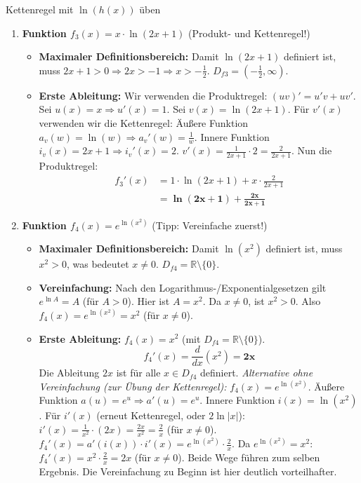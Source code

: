 \begin{loesungsumgebung}{Kettenregel mit \texorpdfstring{$\ln(h(x))$}{ln(h(x))} üben}
\begin{enumerate}[label=(\alph*)]
    \item \textbf{Funktion $f_3(x) = x \cdot \ln(2x+1)$} (Produkt- und Kettenregel!)
    \begin{itemize}
        \item \textbf{Maximaler Definitionsbereich:}
        Damit $\ln(2x+1)$ definiert ist, muss $2x+1 > 0 \Rightarrow 2x > -1 \Rightarrow x > -\frac{1}{2}$.
        $D_{f3} = (-\frac{1}{2}, \infty)$.
        \item \textbf{Erste Ableitung:}
        Wir verwenden die Produktregel: $(uv)' = u'v + uv'$.
        Sei $u(x) = x \Rightarrow u'(x) = 1$.
        Sei $v(x) = \ln(2x+1)$. Für $v'(x)$ verwenden wir die Kettenregel:
        Äußere Funktion $a_v(w) = \ln(w) \Rightarrow a_v'(w) = \frac{1}{w}$.
        Innere Funktion $i_v(x) = 2x+1 \Rightarrow i_v'(x) = 2$.
        $v'(x) = \frac{1}{2x+1} \cdot 2 = \frac{2}{2x+1}$.
        Nun die Produktregel:
        \begin{align*}
        f_3'(x) &= 1 \cdot \ln(2x+1) + x \cdot \frac{2}{2x+1} \\
                &= \mathbf{\ln(2x+1) + \frac{2x}{2x+1}}
        \end{align*}
    \end{itemize}

    \item \textbf{Funktion $f_4(x) = e^{\ln(x^2)}$} (Tipp: Vereinfache zuerst!)
    \begin{itemize}
        \item \textbf{Maximaler Definitionsbereich:}
        Damit $\ln(x^2)$ definiert ist, muss $x^2 > 0$, was bedeutet $x \neq 0$.
        $D_{f4} = \mathbb{R} \setminus \{0\}$.
        \item \textbf{Vereinfachung:}
        Nach den Logarithmus-/Exponentialgesetzen gilt $e^{\ln A} = A$ (für $A>0$).
        Hier ist $A=x^2$. Da $x \neq 0$, ist $x^2 > 0$.
        Also $f_4(x) = e^{\ln(x^2)} = x^2$ (für $x \neq 0$).
        \item \textbf{Erste Ableitung:}
        $f_4(x) = x^2$ (mit $D_{f4} = \mathbb{R} \setminus \{0\}$).
        $$ f_4'(x) = \frac{d}{dx}(x^2) = \mathbf{2x} $$
        Die Ableitung $2x$ ist für alle $x \in D_{f4}$ definiert.
        \textit{Alternative ohne Vereinfachung (zur Übung der Kettenregel):}
        $f_4(x) = e^{\ln(x^2)}$.
        Äußere Funktion $a(u) = e^u \Rightarrow a'(u) = e^u$.
        Innere Funktion $i(x) = \ln(x^2)$. Für $i'(x)$ (erneut Kettenregel, oder $2\ln|x|$):
        $i'(x) = \frac{1}{x^2} \cdot (2x) = \frac{2x}{x^2} = \frac{2}{x}$ (für $x \neq 0$).
        $f_4'(x) = a'(i(x)) \cdot i'(x) = e^{\ln(x^2)} \cdot \frac{2}{x}$.
        Da $e^{\ln(x^2)} = x^2$:
        $f_4'(x) = x^2 \cdot \frac{2}{x} = 2x$ (für $x \neq 0$).
        Beide Wege führen zum selben Ergebnis. Die Vereinfachung zu Beginn ist hier deutlich vorteilhafter.
    \end{itemize}
\end{enumerate}

\end{loesungsumgebung}


